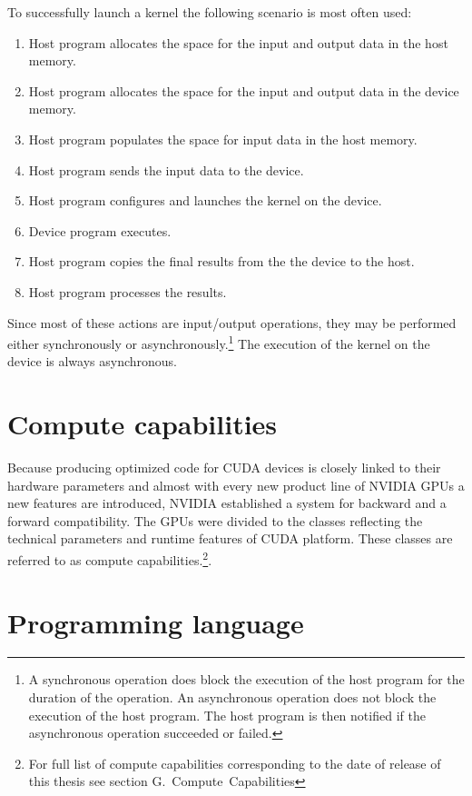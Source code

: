 \documentclass[12pt,oneside]{fithesis2}
\begin{document}
To successfully launch a kernel the following scenario is most often used:
\begin{enumerate}[noitemsep]
	\item Host program allocates the space for the input and output data in the host memory.
	\item Host program allocates the space for the input and output data in the device memory.
	\item Host program populates the space for input data in the host memory.
	\item Host program sends the input data to the device.
	\item Host program configures and launches the kernel on the device.
	\item Device program executes.
	\item Host program copies the final results from the the device to the host.
	\item Host program processes the results. 
\end{enumerate}

\noindent
Since most of these actions are input/output operations, they may be performed either synchronously or asynchronously.\footnote{A synchronous operation does block the execution of the host program for the duration of the operation. An asynchronous operation does not block the execution of the host program. The host program is then notified if the asynchronous operation succeeded or failed.} The execution of the kernel on the device is always asynchronous.

\section{Compute capabilities}

Because producing optimized code for CUDA devices is closely linked to their hardware parameters and almost with every new product line of NVIDIA GPUs a new features are introduced, NVIDIA established a system for backward and a forward compatibility. The GPUs were divided to the classes reflecting the technical parameters and runtime features of CUDA platform. These classes are referred to as compute capabilities.\footnote{For full list of compute capabilities corresponding to the date of release of this thesis see \cite{cuda_guide} section G.~Compute~Capabilities}.

\section{Programming language}
\end{document}
